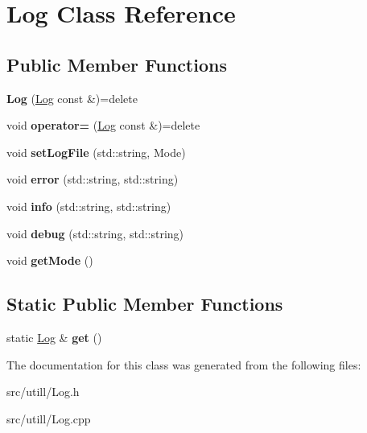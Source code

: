 \hypertarget{classLog}{\section{Log Class Reference}
\label{classLog}
}
\subsection*{Public Member Functions}
\begin{DoxyCompactItemize}
\item 
\hypertarget{classLog_acf321111c34203cfae64f324f2406919}{{\bfseries Log} (\hyperlink{classLog}{Log} const \&)=delete}\label{classLog_acf321111c34203cfae64f324f2406919}

\item 
\hypertarget{classLog_aa7eb1f9ae38ad5efc9f69d43d5817e8f}{void {\bfseries operator=} (\hyperlink{classLog}{Log} const \&)=delete}\label{classLog_aa7eb1f9ae38ad5efc9f69d43d5817e8f}

\item 
\hypertarget{classLog_a022d129d4a3a1520a61512274a9e4e9c}{void {\bfseries set\-Log\-File} (std\-::string, Mode)}\label{classLog_a022d129d4a3a1520a61512274a9e4e9c}

\item 
\hypertarget{classLog_a45cf6016cf2bcf76d8a84877e82730e7}{void {\bfseries error} (std\-::string, std\-::string)}\label{classLog_a45cf6016cf2bcf76d8a84877e82730e7}

\item 
\hypertarget{classLog_ac0eaf5daa5adf932402827ad3f9dabdc}{void {\bfseries info} (std\-::string, std\-::string)}\label{classLog_ac0eaf5daa5adf932402827ad3f9dabdc}

\item 
\hypertarget{classLog_a1561be8afd5072f5af96136c39265c1d}{void {\bfseries debug} (std\-::string, std\-::string)}\label{classLog_a1561be8afd5072f5af96136c39265c1d}

\item 
\hypertarget{classLog_a966590e62c5f1691a438fb4144121a9c}{void {\bfseries get\-Mode} ()}\label{classLog_a966590e62c5f1691a438fb4144121a9c}

\end{DoxyCompactItemize}
\subsection*{Static Public Member Functions}
\begin{DoxyCompactItemize}
\item 
\hypertarget{classLog_ad33d94e0b040b898ee4b88cc0b4c0941}{static \hyperlink{classLog}{Log} \& {\bfseries get} ()}\label{classLog_ad33d94e0b040b898ee4b88cc0b4c0941}

\end{DoxyCompactItemize}


The documentation for this class was generated from the following files\-:\begin{DoxyCompactItemize}
\item 
src/utill/Log.\-h\item 
src/utill/Log.\-cpp\end{DoxyCompactItemize}
